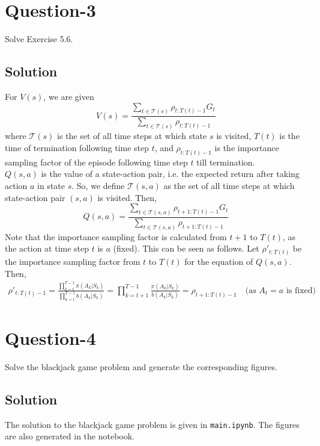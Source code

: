 \documentclass[11pt]{article}
\begin{document}
    \section*{Question-3}
    Solve Exercise 5.6.

    \subsection*{Solution}
    For $V(s)$, we are given
    $$V(s) = \frac{\sum_{t \in \mathcal{T}(s)} \rho_{t:T(t)-1} G_{t}}{\sum_{t \in \mathcal{T}(s)} \rho_{t:T(t)-1}}$$
    where $\mathcal{T}(s)$ is the set of all time steps at which state $s$ is visited, $T(t)$ is the time of termination
    following time step $t$, and $\rho_{t:T(t)-1}$ is the importance sampling factor of the episode following time step $t$
    till termination. \\
    $Q(s, a)$ is the value of a state-action pair, i.e. the expected return after taking action $a$ in state $s$. So,
    we define $\mathcal{T}(s, a)$ as the set of all time steps at which state-action pair $(s, a)$ is visited. Then,
    $$Q(s, a) = \frac{\sum_{t \in \mathcal{T}(s, a)} \rho_{t+1:T(t)-1} G_{t}}{\sum_{t \in \mathcal{T}(s, a)} \rho_{t+1:T(t)-1}}$$
    Note that the importance sampling factor is calculated from $t+1$ to $T(t)$, as the action at time step $t$ is $a$ (fixed).
    This can be seen as follows. Let $\rho'_{t:T(t)}$ be the importance sampling factor from $t$ to $T(t)$ for the equation of
    $Q(s, a)$. Then,
    \begin{align*}
        \rho'_{t:T(t)-1} = \frac{\prod_{k=t}^{T-1} \pi(A_{k} | S_{k})}{\prod_{k=t}^{T-1} b(A_{k} | S_{k})}
        = \prod_{k=t+1}^{T-1} \frac{\pi(A_{k} | S_{k})}{b(A_{k} | S_{k})}
        = \rho_{t+1:T(t)-1} \quad \text{(as $A_{t} = a$ is fixed)}
    \end{align*}

    \section*{Question-4}
    Solve the blackjack game problem and generate the corresponding figures.

    \subsection*{Solution}
    The solution to the blackjack game problem is given in \texttt{main.ipynb}. The figures are also generated in the notebook.
\end{document}
